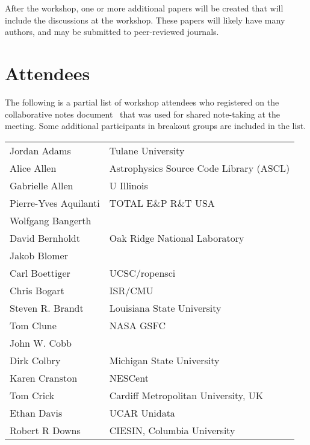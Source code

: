 \documentclass[11pt, oneside]{amsart}
\begin{document}
After the workshop, one or more additional papers will be created that will include the discussions at the workshop.  These papers will likely have many authors, and may be submitted to peer-reviewed journals.

\appendix

\section{Attendees}
\label{sec:attendees}

The following is a partial list of workshop attendees who registered on the
collaborative notes document~\cite{WSSSPE2-google-notes} that was used
for shared note-taking at the meeting. Some additional
participants in breakout groups are included in the list.

\begin{longtable}{ll}
Jordan Adams          &  Tulane University                       \\
Alice Allen           &  Astrophysics Source Code Library (ASCL) \\
Gabrielle Allen       &  U Illinois                              \\
Pierre-Yves Aquilanti &  TOTAL E\&P R\&T USA                     \\
Wolfgang Bangerth     \\
David Bernholdt       &  Oak Ridge National Laboratory           \\
Jakob Blomer          \\
Carl Boettiger        &  UCSC/ropensci                           \\
Chris Bogart          &  ISR/CMU                                 \\
Steven R. Brandt      &  Louisiana State University              \\
Tom Clune             &  NASA GSFC                               \\
John W. Cobb          \\
Dirk Colbry           &  Michigan State University               \\
Karen Cranston        &  NESCent                                 \\
Tom Crick             &  Cardiff Metropolitan University, UK     \\
Ethan Davis           &  UCAR Unidata                            \\
Robert R Downs        &  CIESIN, Columbia University             \\

\end{longtable}
\end{document}
